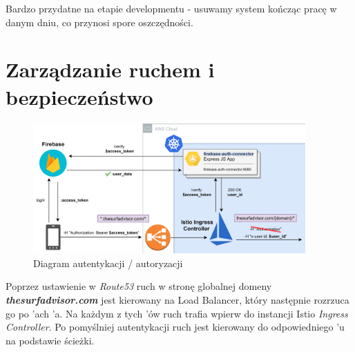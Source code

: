 Bardzo przydatne na etapie developmentu - usuwamy system kończąc pracę w danym dniu, co przynosi spore oszczędności.

\newpage

\section{Zarządzanie ruchem i bezpieczeństwo}
\label{traffic}

\begin{figure}[!ht]
    
	\begin{center}
		\includegraphics[width=0.93\textwidth]{img/security-flow}
	\end{center}
    \caption{Diagram autentykacji / autoryzacji}
    \label{security-diagram}
\end{figure}

Poprzez ustawienie w \emph{Route53} ruch w stronę globalnej domeny \emph{\textbf{thesurfadvisor.com}} jest kierowany na Load Balancer, 
który następnie rozrzuca go po 'ach 'a.
Na każdym z tych 'ów ruch trafia wpierw do instancji Istio \emph{Ingress Controller}. 
Po pomyślniej autentykacji ruch jest kierowany do odpowiedniego 'u na podstawie ścieżki.

